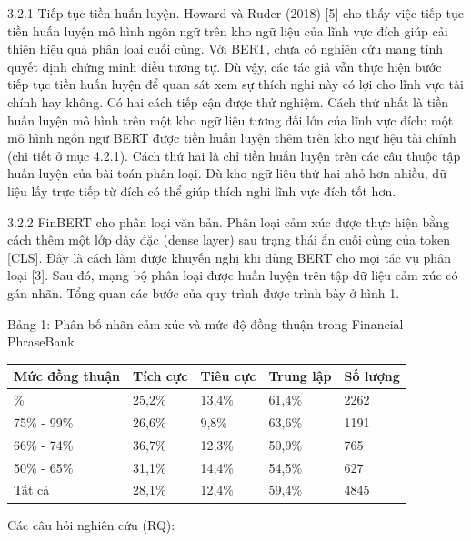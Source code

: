 3.2.1 Tiếp tục tiền huấn luyện. Howard và Ruder (2018) {[}5{]} cho thấy việc tiếp tục tiền huấn luyện mô hình ngôn ngữ trên kho ngữ liệu của lĩnh vực đích giúp cải thiện hiệu quả phân loại cuối cùng. Với BERT, chưa có nghiên cứu mang tính quyết định chứng minh điều tương tự. Dù vậy, các tác giả vẫn thực hiện bước tiếp tục tiền huấn luyện để quan sát xem sự thích nghi này có lợi cho lĩnh vực tài chính hay không. Có hai cách tiếp cận được thử nghiệm. Cách thứ nhất là tiền huấn luyện mô hình trên một kho ngữ liệu tương đối lớn của lĩnh vực đích: một mô hình ngôn ngữ BERT được tiền huấn luyện thêm trên kho ngữ liệu tài chính (chi tiết ở mục 4.2.1). Cách thứ hai là chỉ tiền huấn luyện trên các câu thuộc tập huấn luyện của bài toán phân loại. Dù kho ngữ liệu thứ hai nhỏ hơn nhiều, dữ liệu lấy trực tiếp từ đích có thể giúp thích nghi lĩnh vực đích tốt hơn.

3.2.2 FinBERT cho phân loại văn bản. Phân loại cảm xúc được thực hiện bằng cách thêm một lớp dày đặc (dense layer) sau trạng thái ẩn cuối cùng của token {[}CLS{]}. Đây là cách làm được khuyến nghị khi dùng BERT cho mọi tác vụ phân loại {[}3{]}. Sau đó, mạng bộ phân loại được huấn luyện trên tập dữ liệu cảm xúc có gán nhãn. Tổng quan các bước của quy trình được trình bày ở hình 1.

Bảng 1: Phân bố nhãn cảm xúc và mức độ đồng thuận trong Financial PhraseBank

{\small
\begin{longtable}[]{@{}lllll@{}}
\toprule\noalign{}
Mức đồng thuận & Tích cực & Tiêu cực & Trung lập & Số lượng \\
\midrule\noalign{}
\endhead
\bottomrule\noalign{}
\endlastfoot
100\% & 25,2\% & 13,4\% & 61,4\% & 2262 \\
75\% - 99\% & 26,6\% & 9,8\% & 63,6\% & 1191 \\
66\% - 74\% & 36,7\% & 12,3\% & 50,9\% & 765 \\
50\% - 65\% & 31,1\% & 14,4\% & 54,5\% & 627 \\
Tất cả & 28,1\% & 12,4\% & 59,4\% & 4845 \\
\end{longtable}
}

Các câu hỏi nghiên cứu (RQ):

